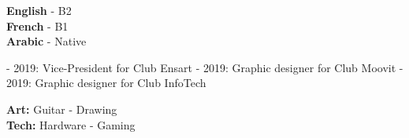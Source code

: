 \documentclass[10pt]{developercv} %
\begin{document}

\begin{minipage}[t]{0.2\textwidth}
	\vspace{-\baselineskip} %

	
	\textbf{English} - B2\\
	\textbf{French} - B1\\
	\textbf{Arabic} - Native\\
\end{minipage}
\hfill
\begin{minipage}[t]{0.5\textwidth}
	\vspace{-\baselineskip} %

    { - 2019: Vice-President for Club Ensart}
	{ - 2019: Graphic designer for Club Moovit}
    { - 2019: Graphic designer for Club InfoTech}

\end{minipage}
\hfill
\begin{minipage}[t]{0.2\textwidth}
	\vspace{-\baselineskip} %

	
	\textbf{Art:}
	{\newline Guitar  - Drawing}\\
    \textbf{Tech:}
    {\newline Hardware - Gaming}

\end{minipage}
\end{document}
